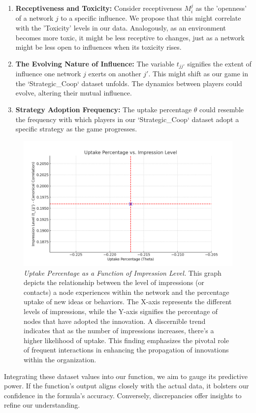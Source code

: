 \documentclass[sn-nature]{sn-jnl}%
\newcommand{\sbt}{\,\begin{picture}(-1,1)(-1,-3)\circle*{3}\end{picture}\ }
\theoremstyle{thmstyleone}%
\theoremstyle{thmstyletwo}%
\theoremstyle{thmstylethree}%
\begin{document}
\begin{enumerate}
    \item[\sbt] \textbf{Receptiveness and Toxicity:} Consider receptiveness \( M_i^j \) as the 'openness' of a network \( j \) to a specific influence. We propose that this might correlate with the 'Toxicity' levels in our data. Analogously, as an environment becomes more toxic, it might be less receptive to changes, just as a network might be less open to influences when its toxicity rises.

    \item[\sbt] \textbf{The Evolving Nature of Influence:} The variable \( t_{jj'} \) signifies the extent of influence one network \( j \) exerts on another \( j' \). This might shift as our game in the `Strategic\_Coop` dataset unfolds. The dynamics between players could evolve, altering their mutual influence.

    \item[\sbt] \textbf{Strategy Adoption Frequency:} The uptake percentage \( \theta \) could resemble the frequency with which players in our `Strategic\_Coop` dataset adopt a specific strategy as the game progresses.
\end{enumerate}
\begin{figure}[H]
    \centering
    \includegraphics[width=0.75\linewidth]{uptake_percentage_vs_impression_level.png}
    \caption[Uptake Percentage as a Function of Impression Level]{\textit{Uptake Percentage as a Function of Impression Level.} This graph depicts the relationship between the level of impressions (or contacts) a node experiences within the network and the percentage uptake of new ideas or behaviors. The X-axis represents the different levels of impressions, while the Y-axis signifies the percentage of nodes that have adopted the innovation. A discernible trend indicates that as the number of impressions increases, there's a higher likelihood of uptake. This finding emphasizes the pivotal role of frequent interactions in enhancing the propagation of innovations within the organization.}

    \label{fig:enter-label}
\end{figure}
Integrating these dataset values into our function, we aim to gauge its predictive power. If the function's output aligns closely with the actual data, it bolsters our confidence in the formula's accuracy. Conversely, discrepancies offer insights to refine our understanding.
\end{document}
